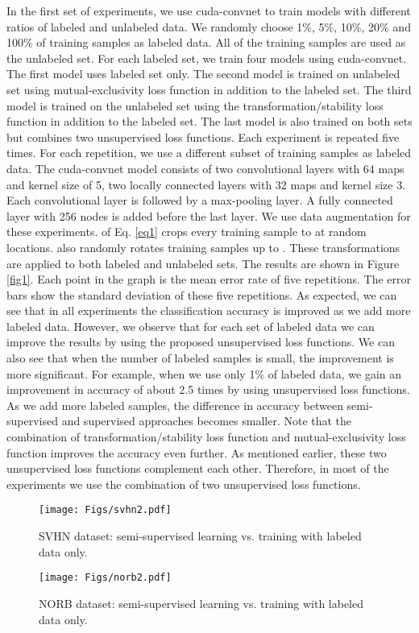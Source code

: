 \documentclass{article}
\begin{document}
In the first set of experiments, we use cuda-convnet to train models with different ratios of labeled and unlabeled data. We randomly choose 1\%, 5\%, 10\%, 20\% and 100\% of training samples as labeled data. All of the training samples are used as the unlabeled set. For each labeled set, we train four models using cuda-convnet. The first model uses labeled set only. The second model is trained on unlabeled set using mutual-exclusivity loss function in addition to the labeled set. The third model is trained on the unlabeled set using the transformation/stability loss function in addition to the labeled set. The last model is also trained on both sets but combines two unsupervised loss functions. Each experiment is repeated five times. For each repetition, we use a different subset of training samples as labeled data. The cuda-convnet model consists of two convolutional layers with 64 maps and kernel size of 5, two locally connected layers with 32 maps and kernel size 3. Each convolutional layer is followed by a max-pooling layer. A fully connected layer with 256 nodes is added before the last layer. We use data augmentation for these experiments.  of Eq. \ref{eq1} crops every training sample to  at random locations.  also randomly rotates training samples up to . These transformations are applied to both labeled and unlabeled sets. The results are shown in Figure \ref{fig1}. Each point in the graph is the mean error rate of five repetitions. The error bars show the standard deviation of these five repetitions. As expected, we can see that in all experiments the classification accuracy is improved as we add more labeled data. However, we observe that for each set of labeled data we can improve the results by using the proposed unsupervised loss functions. We can also see that when the number of labeled samples is small, the improvement is more significant. For example, when we use only 1\% of labeled data, we gain an improvement in accuracy of about 2.5 times by using unsupervised loss functions. As we add more labeled samples, the difference in accuracy between semi-supervised and supervised approaches becomes smaller. Note that the combination of transformation/stability loss function and mutual-exclusivity loss function improves the accuracy even further. As mentioned earlier, these two unsupervised loss functions complement each other. Therefore, in most of the experiments we use the combination of two unsupervised loss functions.

\begin{figure}[ht]
\centering
\begin{minipage}{.48\textwidth}
	\centering
	\texttt{[image: Figs/svhn2.pdf]}
	\caption{SVHN dataset: semi-supervised learning vs. training with labeled data only.}
   	\label{fig1}    
\end{minipage}\hspace{0.5cm}\begin{minipage}{.48\textwidth}
	\centering
	\texttt{[image: Figs/norb2.pdf]}
	\caption{NORB dataset: semi-supervised learning vs. training with labeled data only.}
   	\label{fig2} 
\end{minipage}
\end{figure}
\end{document}

